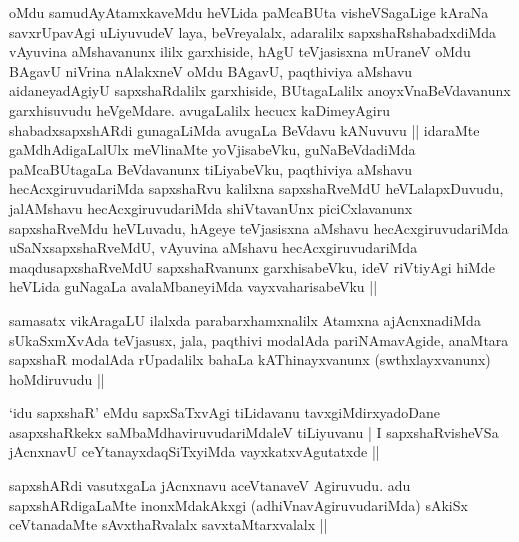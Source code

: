 \begin{artha}
oMdu samudAyAtamxkaveMdu heVLida paMcaBUta visheVSagaLige kAraNa savxrUpavAgi uLiyuvudeV laya, beVreyalalx, adaralilx \footnotemark[1]sapxshaRshabadxdiMda vAyuvina aMshavanunx ililx garxhiside, hAgU teVjasisxna mUraneV oMdu BAgavU niVrina nAlakxneV oMdu BAgavU, paqthiviya aMshavu aidaneyadAgiyU sapxshaRdalilx garxhiside, BUtagaLalilx anoyxVnaBeVdavanunx garxhisuvudu heVgeMdare. avugaLalilx hecucx kaDimeyAgiru shabadxsapxshARdi gunagaLiMda avugaLa BeVdavu kANuvuvu || idaraMte gaMdhAdigaLalUlx meVlinaMte yoVjisabeVku, guNaBeVdadiMda paMcaBUtagaLa BeVdavanunx tiLiyabeVku, paqthiviya aMshavu hecAcxgiruvudariMda sapxshaRvu kalilxna sapxshaRveMdU heVLalapxDuvudu, jalAMshavu hecAcxgiruvudariMda shiVtavanUnx piciCxlavanunx sapxshaRveMdu heVLuvadu, hAgeye teVjasisxna aMshavu hecAcxgiruvudariMda uSaNxsapxshaRveMdU, vAyuvina aMshavu hecAcxgiruvudariMda maqdusapxshaRveMdU sapxshaRvanunx garxhisabeVku, ideV riVtiyAgi hiMde heVLida guNagaLa avalaMbaneyiMda vayxvaharisabeVku ||
\end{artha}

\begin{artha}
samasatx vikAragaLU ilalxda parabarxhamxnalilx Atamxna ajAcnxnadiMda sUkaSxmXvAda teVjasusx, jala, paqthivi modalAda pariNAmavAgide, anaMtara sapxshaR modalAda rUpadalilx bahaLa kAThinayxvanunx (swthxlayxvanunx) hoMdiruvudu ||
\end{artha}

\begin{artha}
`idu sapxshaR' eMdu sapxSaTxvAgi tiLidavanu tavxgiMdirxyadoDane asapxshaRkekx saMbaMdhaviruvudariMdaleV tiLiyuvanu | I sapxshaRvisheVSa jAcnxnavU ceYtanayxdaqSiTxyiMda vayxkatxvAgutatxde ||
\end{artha}

\begin{artha}
sapxshARdi vasutxgaLa jAcnxnavu aceVtanaveV Agiruvudu. adu sapxshARdigaLaMte inonxMdakAkxgi (adhiVnavAgiruvudariMda) sAkiSx ceVtanadaMte sAvxthaRvalalx savxtaMtarxvalalx ||
\end{artha}

